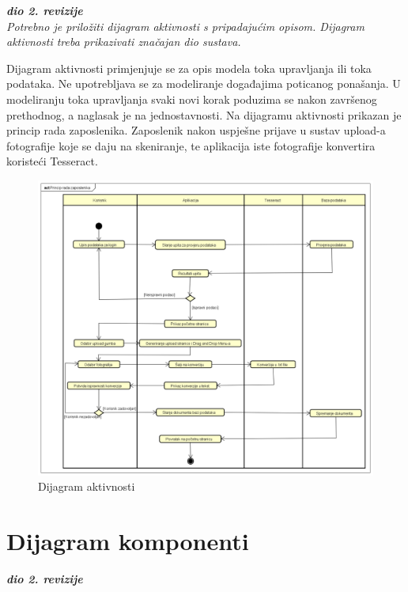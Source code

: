 			\textbf{\textit{dio 2. revizije}}\\
			
			 \textit{Potrebno je priložiti dijagram aktivnosti s pripadajućim opisom. Dijagram aktivnosti treba prikazivati značajan dio sustava.}
			
			Dijagram aktivnosti primjenjuje se za opis modela toka upravljanja ili toka podataka. Ne upotrebljava se za modeliranje događajima poticanog ponašanja. U modeliranju toka upravljanja svaki novi korak poduzima se nakon završenog prethodnog, a naglasak je na jednostavnosti. Na dijagramu aktivnosti prikazan je princip rada zaposlenika. Zaposlenik nakon uspješne prijave u sustav upload-a fotografije koje se daju na skeniranje, te aplikacija iste fotografije konvertira koristeći Tesseract.

			\begin{figure}[H]
				\includegraphics[scale=0.5]{slike/dijagram_aktivnosti.png} %
				\centering
				\caption{Dijagram aktivnosti}
				\label{fig:promjene}
			\end{figure}


			\eject
		\section{Dijagram komponenti}
		
			\textbf{\textit{dio 2. revizije}}\\
		
